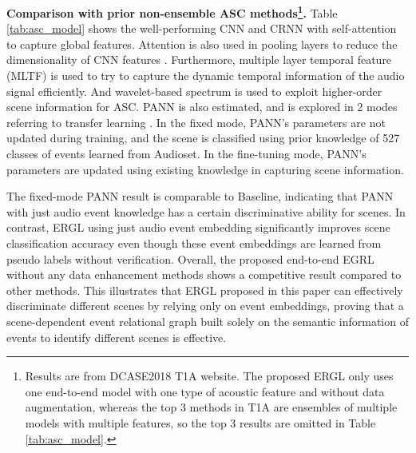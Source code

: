 \documentclass{article}
\begin{document}
\textbf{Comparison with prior non-ensemble ASC methods\footnote{Results are from DCASE2018 T1A website. 
The proposed ERGL only uses one end-to-end model with one type of acoustic feature and without data augmentation, whereas the top 3 methods in T1A are ensembles of multiple models with multiple features, so the top 3 results are omitted in Table \ref{tab:asc_model}.}.}
Table \ref{tab:asc_model} shows the well-performing CNN \cite{DCASE2018}\cite{Kong2018} and CRNN \cite{wang2018self} with self-attention to capture global features.
Attention is also used in pooling layers to reduce the dimensionality of CNN features \cite{Ren2018}.
Furthermore, multiple layer temporal feature (MLTF) \cite{Zhang2018-svm} is used to try to capture the dynamic temporal information of the audio signal efficiently.
And wavelet-based spectrum \cite{li_icmew} is used to exploit higher-order scene information for ASC.
PANN \cite{kong2020panns} is also estimated, and is explored in 2 modes referring to transfer learning \cite{interspeech2020hyb}.
In the fixed mode, PANN's parameters are not updated during training, and the scene is classified using prior knowledge of 527 classes of events learned from Audioset.
In the fine-tuning mode, PANN's parameters are updated using existing knowledge in capturing scene information.




The fixed-mode PANN result is comparable to Baseline, indicating that PANN with just audio event knowledge has a certain discriminative ability for scenes. 
In contrast, ERGL using just audio event embedding significantly improves scene classification accuracy even though these event embeddings are learned from pseudo labels without verification.
Overall, the proposed end-to-end EGRL without any data enhancement methods shows a competitive result compared to other methods. 
This illustrates that ERGL proposed in this paper can effectively discriminate different scenes by relying only on event embeddings, proving that a scene-dependent event relational graph built solely on the semantic information of events to identify different scenes is effective.

 
\end{document}
